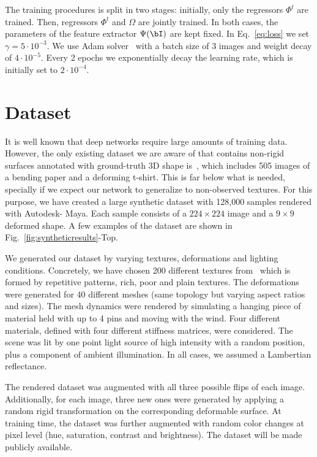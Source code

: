 \documentclass[10pt,twocolumn,letterpaper]{article}
\begin{document}
 
 
The training procedures is split in two stages: initially, only the regressors $\Phi^t$ are trained. Then, regressors $\Phi^t$ and $\Omega$ are jointly trained. In both cases, the parameters of the feature extractor $\Psi(\bI)$ are kept fixed. In Eq.~\eqref{eq:loss} we set $\gamma = 5\cdot 10^{-3}$. We use Adam solver~\cite{kingma2014adam} with a batch size of 3 images and weight decay of $4\cdot 10^{-5}$. Every 2 epochs we exponentially decay the learning rate, which is initially set to $2\cdot 10^{-4}$. 




\section{Dataset}
\label{sec:Dataset}
It is well known that deep networks require large amounts of training data. However, the only existing dataset we are aware of that contains non-rigid surfaces annotated with ground-truth 3D shape is~\cite{varol2012constrained}, which includes 505 images of a bending paper and a deforming t-shirt. This is far below what is needed, specially if we expect our network to generalize to non-observed textures. For this purpose, we have created a large synthetic dataset with 128,000 samples rendered with Autodesk\texttrademark - Maya. Each sample consists of a $224 \times 224$  image and a $9\times 9$ deformed shape. A few examples of the dataset are shown in Fig.~\ref{fig:syntheticresults}-Top.

We generated our dataset by varying textures, deformations and lighting conditions. Concretely, we have chosen 200 different textures from~\cite{synthesizability} which is formed by repetitive patterns, rich, poor and plain textures. The deformations were generated for 40 different meshes (same topology but varying aspect ratios and sizes). The mesh dynamics were rendered by simulating a hanging piece of material held with up to 4 pins and moving with the wind. Four different materials, defined with four different stiffness matrices, were considered. The scene was lit by one point light source of high intensity with a random position, plus a component of ambient illumination. In all cases, we assumed a Lambertian reflectance.

The rendered dataset was augmented with all three possible flips of each image. Additionally, for each image, three new ones were generated by applying a random rigid transformation on the corresponding deformable surface. At training time, the dataset was further augmented with random color changes at pixel level (hue, saturation, contrast and brightness). The dataset will be made publicly available.
\end{document}
